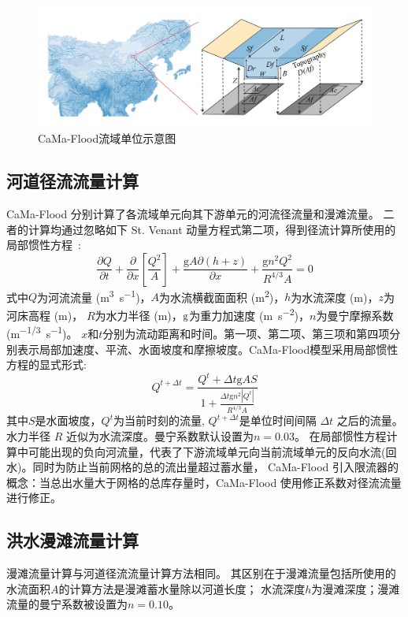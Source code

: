 {
  \begin{figure}[htbp]
    \centering
    \includegraphics[width=\textwidth]{Figures/陆地表面的水分循环/CaMa-Flood流域单位示意图.png}
    \caption{CaMa-Flood流域单位示意图}
    \label{fig:CaMa-Flood流域单位示意图}
  \end{figure}
}

\subsection{河道径流流量计算}
CaMa-Flood 分别计算了各流域单元向其下游单元的河流径流量和漫滩流量。
二者的计算均通过忽略如下 St. Venant 动量方程式第二项，得到径流计算所使用的局部惯性方程~\citep{bates2010}:
\begin{equation}
  \frac{\partial Q}{\partial t}+\frac{\partial}{\partial x}\left[\frac{Q^{2}}{A}\right]+\frac{{\mathrm g} A \partial(h+z)}{\partial x}+\frac{{\mathrm g} n^{2} Q^{2}}{R^{4 / 3} A}=0
\end{equation}
式中$Q$为河流流量 (\unit{m^3.s^{-1}})，$A$为水流横截面面积 (\unit{m^2})，$h$为水流深度 (m)，$z$为河床高程 (m)，
$R$为水力半径 (m)，$\rm g$为重力加速度 (\unit{m.s^{-2}})，$n$为曼宁摩擦系数(\unit{m^{-1/3}.s^{-1}})。
$x$和$t$分别为流动距离和时间。第一项、第二项、第三项和第四项分别表示局部加速度、平流、水面坡度和摩擦坡度。CaMa-Flood模型采用局部惯性方程的显式形式:
%
\begin{equation}
  Q^{t+\Delta t}=\frac{Q^{t}+\Delta t {\mathrm g} AS}{1+\frac{\Delta t {\mathrm g} n^{2}\left|Q^{t}\right|}{R^{4 / 3} A}}
\end{equation}
其中$S$是水面坡度，$Q^t$为当前时刻的流量, $Q^{t+\Delta t}$是单位时间间隔 $\Delta t$ 之后的流量。水力半径 $R$ 近似为水流深度。曼宁系数默认设置为$n=0.03$。
在局部惯性方程计算中可能出现的负向河流量，代表了下游流域单元向当前流域单元的反向水流(回水)。同时为防止当前网格的总的流出量超过蓄水量，
CaMa-Flood 引入限流器的概念：当总出水量大于网格的总库存量时，CaMa-Flood 使用修正系数对径流流量进行修正。


\subsection{洪水漫滩流量计算}
漫滩流量计算与河道径流流量计算方法相同。
其区别在于漫滩流量包括所使用的水流面积$A$的计算方法是漫滩蓄水量除以河道长度；
水流深度$h$为漫滩深度；漫滩流量的曼宁系数被设置为$n=0.10$。


